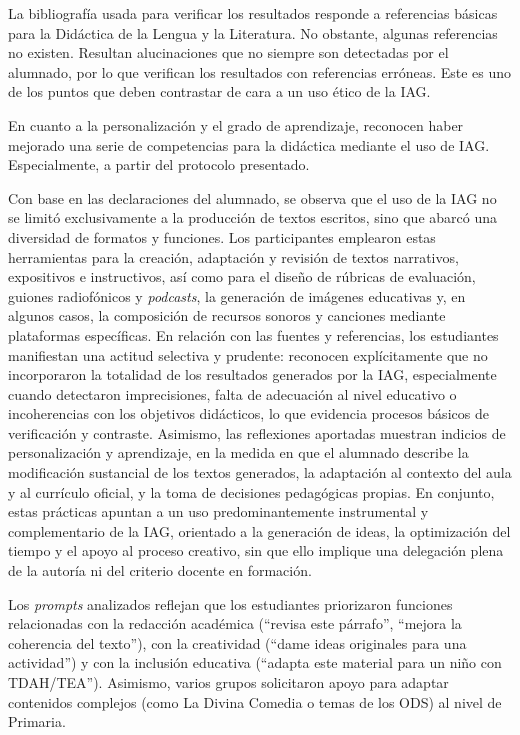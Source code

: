 \documentclass[spanish]{textolivre}
\begin{document}
La bibliografía usada para verificar los resultados responde a referencias básicas para la Didáctica de la Lengua y la Literatura. No obstante, algunas referencias no existen. Resultan alucinaciones que no siempre son detectadas por el alumnado, por lo que verifican los resultados con referencias erróneas. Este es uno de los puntos que deben contrastar de cara a un uso ético de la IAG.

En cuanto a la personalización y el grado de aprendizaje, reconocen haber mejorado una serie de competencias para la didáctica mediante el uso de IAG. Especialmente, a partir del protocolo presentado.

Con base en las declaraciones del alumnado, se observa que el uso de la IAG no se limitó exclusivamente a la producción de textos escritos, sino que abarcó una diversidad de formatos y funciones. Los participantes emplearon estas herramientas para la creación, adaptación y revisión de textos narrativos, expositivos e instructivos, así como para el diseño de rúbricas de evaluación, guiones radiofónicos y \textit{podcasts}, la generación de imágenes educativas y, en algunos casos, la composición de recursos sonoros y canciones mediante plataformas específicas. En relación con las fuentes y referencias, los estudiantes manifiestan una actitud selectiva y prudente: reconocen explícitamente que no incorporaron la totalidad de los resultados generados por la IAG, especialmente cuando detectaron imprecisiones, falta de adecuación al nivel educativo o incoherencias con los objetivos didácticos, lo que evidencia procesos básicos de verificación y contraste. Asimismo, las reflexiones aportadas muestran indicios de personalización y aprendizaje, en la medida en que el alumnado describe la modificación sustancial de los textos generados, la adaptación al contexto del aula y al currículo oficial, y la toma de decisiones pedagógicas propias. En conjunto, estas prácticas apuntan a un uso predominantemente instrumental y complementario de la IAG, orientado a la generación de ideas, la optimización del tiempo y el apoyo al proceso creativo, sin que ello implique una delegación plena de la autoría ni del criterio docente en formación.

Los \textit{prompts} analizados reflejan que los estudiantes priorizaron funciones relacionadas con la redacción académica (“revisa este párrafo”, “mejora la coherencia del texto”), con la creatividad (“dame ideas originales para una actividad”) y con la inclusión educativa (“adapta este material para un niño con TDAH/TEA”). Asimismo, varios grupos solicitaron apoyo para adaptar contenidos complejos (como La Divina Comedia o temas de los ODS) al nivel de Primaria.
\end{document}
